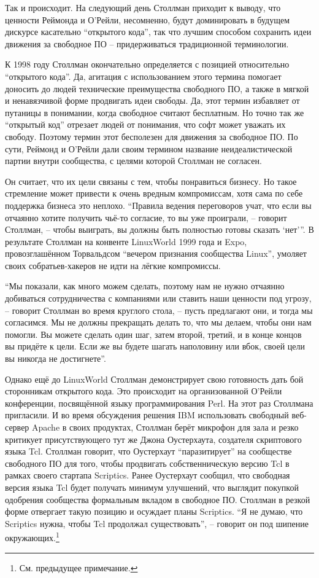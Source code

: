 Так и происходит. На следующий день Столлман приходит к выводу, что ценности Реймонда и О'Рейли, несомненно, будут доминировать в будущем дискурсе касательно \enquote{открытого кода}, так что лучшим способом сохранить идеи движения за свободное ПО -- придерживаться традиционной терминологии.

К 1998 году Столлман окончательно определяется с позицией относительно \enquote{открытого кода}. Да, агитация с использованием этого термина помогает доносить до людей технические преимущества свободного ПО, а также в мягкой и ненавязчивой форме продвигать идеи свободы. Да, этот термин избавляет от путаницы в понимании, когда свободное считают бесплатным. Но точно так же \enquote{открытый код} отрезает людей от понимания, что софт может уважать их свободу. Поэтому термин этот бесполезен для движения за свободное ПО. По сути, Реймонд и О'Рейли дали своим термином название неидеалистической партии внутри сообщества, с целями которой Столлман не согласен.

Он считает, что их цели связаны с тем, чтобы понравиться бизнесу. Но такое стремление может привести к очень вредным компромиссам, хотя сама по себе поддержка бизнеса это неплохо. \enquote{Правила ведения переговоров учат, что если вы отчаянно хотите получить чьё-то согласие, то вы уже проиграли, -- говорит Столлман, -- чтобы выиграть, вы должны быть полностью готовы сказать \enquote{нет}}. В результате Столлман на конвенте  LinuxWorld 1999 года и Expo, провозглашённом Торвальдсом \enquote{вечером признания сообщества Linux}, умоляет своих собратьев-хакеров не идти на лёгкие компромиссы.

\enquote{Мы показали, как много можем сделать, поэтому нам не нужно отчаянно добиваться сотрудничества с компаниями или ставить наши ценности под угрозу, -- говорит Столлман во время круглого стола, -- пусть предлагают они, и тогда мы согласимся. Мы не должны прекращать делать то, что мы делаем, чтобы они нам помогли. Вы можете сделать один шаг, затем второй, третий, и в конце концов вы придёте к цели. Если же вы будете шагать наполовину или вбок, своей цели вы никогда не достигнете}.

Однако ещё до LinuxWorld Столлман демонстрирует свою готовность дать бой сторонникам открытого кода. Это происходит на организованной О'Рейли конференции, посвящённой языку программирования Perl. На этот раз Столлмана пригласили. И во время обсуждения решения IBM использовать свободный веб-сервер Apache в своих продуктах, Столлман берёт микрофон для зала и резко критикует присутствующего тут же Джона Оустерхаута, создателя скриптового языка Tcl. Столлман говорит, что Оустерхаут \enquote{паразитирует} на сообществе свободного ПО для того, чтобы продвигать собственническую версию Tcl в рамках своего стартапа Scriptics. Ранее Оустерхаут сообщил, что свободная версия языка Tcl будет получать минимум улучшений, что выглядит покупкой одобрения сообщества формальным вкладом в свободное ПО. Столлман в резкой форме отвергает такую позицию и осуждает планы Scriptics. \enquote{Я не думаю, что Scriptics нужна, чтобы Tcl продолжал существовать}, -- говорит он под шипение окружающих.\footnote{См. предыдущее примечание.}

